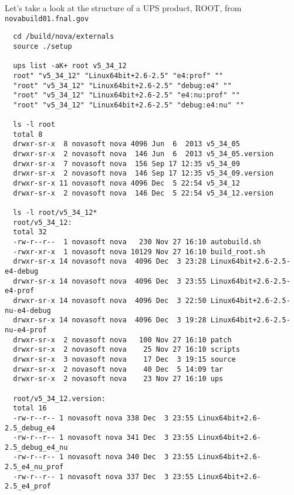 \documentclass[letterpaper,10pt]{article}
\begin{document}
\noindent
Let's take a look at the structure of a UPS product, ROOT, from \verb|novabuild01.fnal.gov|
\begin{verbatim}
  cd /build/nova/externals
  source ./setup

  ups list -aK+ root v5_34_12
  root" "v5_34_12" "Linux64bit+2.6-2.5" "e4:prof" ""
  "root" "v5_34_12" "Linux64bit+2.6-2.5" "debug:e4" ""
  "root" "v5_34_12" "Linux64bit+2.6-2.5" "e4:nu:prof" ""
  "root" "v5_34_12" "Linux64bit+2.6-2.5" "debug:e4:nu" ""

  ls -l root
  total 8
  drwxr-sr-x  8 novasoft nova 4096 Jun  6  2013 v5_34_05
  drwxr-sr-x  2 novasoft nova  146 Jun  6  2013 v5_34_05.version
  drwxr-sr-x  7 novasoft nova  156 Sep 17 12:35 v5_34_09
  drwxr-sr-x  2 novasoft nova  146 Sep 17 12:35 v5_34_09.version
  drwxr-sr-x 11 novasoft nova 4096 Dec  5 22:54 v5_34_12
  drwxr-sr-x  2 novasoft nova  146 Dec  5 22:54 v5_34_12.version

  ls -l root/v5_34_12*
  root/v5_34_12:
  total 32
  -rw-r--r--  1 novasoft nova   230 Nov 27 16:10 autobuild.sh
  -rwxr-xr-x  1 novasoft nova 10129 Nov 27 16:10 build_root.sh
  drwxr-sr-x 14 novasoft nova  4096 Dec  3 23:28 Linux64bit+2.6-2.5-e4-debug
  drwxr-sr-x 14 novasoft nova  4096 Dec  3 23:55 Linux64bit+2.6-2.5-e4-prof
  drwxr-sr-x 14 novasoft nova  4096 Dec  3 22:50 Linux64bit+2.6-2.5-nu-e4-debug
  drwxr-sr-x 14 novasoft nova  4096 Dec  3 19:28 Linux64bit+2.6-2.5-nu-e4-prof
  drwxr-sr-x  2 novasoft nova   100 Nov 27 16:10 patch
  drwxr-sr-x  2 novasoft nova    25 Nov 27 16:10 scripts
  drwxr-sr-x  3 novasoft nova    17 Dec  3 19:15 source
  drwxr-sr-x  2 novasoft nova    40 Dec  5 14:09 tar
  drwxr-sr-x  2 novasoft nova    23 Nov 27 16:10 ups

  root/v5_34_12.version:
  total 16
  -rw-r--r-- 1 novasoft nova 338 Dec  3 23:55 Linux64bit+2.6-2.5_debug_e4
  -rw-r--r-- 1 novasoft nova 341 Dec  3 23:55 Linux64bit+2.6-2.5_debug_e4_nu
  -rw-r--r-- 1 novasoft nova 340 Dec  3 23:55 Linux64bit+2.6-2.5_e4_nu_prof
  -rw-r--r-- 1 novasoft nova 337 Dec  3 23:55 Linux64bit+2.6-2.5_e4_prof
\end{verbatim}
\end{document}
